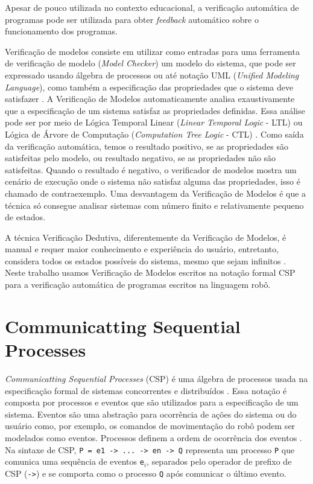 
Apesar de pouco utilizada no contexto educacional, a verificação automática de programas pode ser utilizada para obter \textit{feedback} automático sobre o funcionamento dos programas. 

Verificação de modelos consiste em utilizar como entradas para uma ferramenta de verificação de modelo (\textit{Model Checker}) um modelo do sistema, que pode ser expressado usando álgebra de processos ou até notação UML (\textit{Unified Modeling Language}), como também a especificação das propriedades que o sistema deve satisfazer \cite{FEIGN}. A Verificação de Modelos automaticamente analisa exaustivamente que a especificação de um sistema satisfaz as propriedades definidas. Essa análise pode ser por meio de Lógica Temporal Linear (\textit{Linear Temporal Logic} - LTL) ou Lógica de Árvore de Computação (\textit{Computation Tree Logic} - CTL) \cite{ZHAO2014}. Como saída da verificação automática, temos o resultado positivo, se as propriedades são satisfeitas pelo modelo, ou resultado negativo, se as propriedades não são satisfeitas. Quando o resultado é negativo, o verificador de modelos mostra um cenário de execução onde o sistema não satisfaz alguma das propriedades, isso é chamado de contraexemplo. Uma desvantagem da Verificação de Modelos é que a técnica só consegue analisar sistemas com número finito e relativamente pequeno de estados. 

A técnica Verificação Dedutiva, diferentemente da Verificação de Modelos, é manual e requer maior conhecimento e experiência do usuário, entretanto, considera todos os estados possíveis do sistema, mesmo que sejam infinitos \cite{FEIGN}. Neste trabalho usamos Verificação de Modelos escritos na notação formal CSP para a verificação automática de programas escritos na linguagem robô.

\section{Communicatting Sequential Processes}
\label{sec:csp}
\textit{Communicatting Sequential Processes} (CSP) é uma álgebra de processos usada na especificação formal de sistemas concorrentes e distribuídos \cite{Cleaveland2018}. Essa notação é composta por processos e eventos que são utilizados para a especificação de um sistema. Eventos são uma abstração para ocorrência de ações do sistema ou do usuário como, por exemplo, os comandos de movimentação do robô podem ser modelados como eventos. Processos definem a ordem de ocorrência dos eventos \cite{Roscoe2010}. Na sintaxe de CSP, \texttt{P = e1 -> ... -> en -> Q} representa um processo \texttt{P} que comunica uma sequência de eventos \texttt{e$_i$}, separados pelo operador de prefixo de CSP (\texttt{->}) e se comporta como o processo \texttt{Q} após comunicar o último evento.

